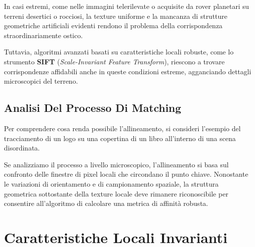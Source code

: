 ﻿\documentclass[11pt, a4paper]{article}
\begin{document}
In casi estremi, come nelle immagini telerilevate o acquisite da rover planetari su terreni desertici o rocciosi, la texture uniforme e la mancanza di strutture geometriche artificiali evidenti rendono il problema della corrispondenza straordinariamente ostico.


Tuttavia, algoritmi avanzati basati su caratteristiche locali robuste, come lo strumento \textbf{SIFT} (\emph{Scale-Invariant Feature Transform}), riescono a trovare corrispondenze affidabili anche in queste condizioni estreme, agganciando dettagli microscopici del terreno.


\subsection{Analisi Del Processo Di Matching}

Per comprendere cosa renda possibile l'allineamento, si consideri l'esempio del tracciamento di un logo su una copertina di un libro all'interno di una scena disordinata.


Se analizziamo il processo a livello microscopico, l'allineamento si basa sul confronto delle finestre di pixel locali che circondano il punto chiave. Nonostante le variazioni di orientamento e di campionamento spaziale, la struttura geometrica sottostante della texture locale deve rimanere riconoscibile per consentire all'algoritmo di calcolare una metrica di affinità robusta.


\newpage

\section{Caratteristiche Locali Invarianti}
\end{document}
